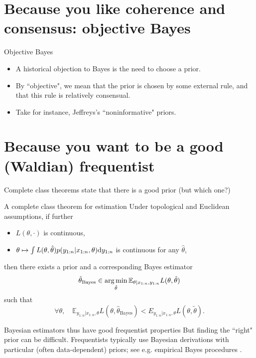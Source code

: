 \documentclass[10pt]{beamer}
\begin{document}
\section{Because you like coherence and consensus: objective Bayes}
\begin{frame}{Objective Bayes}
\begin{itemize}
\item A historical objection to Bayes is the need to choose a prior.
\item By ``objective", we mean that the prior is chosen by some external rule, and that this rule is relatively consensual.
\item Take for instance, Jeffreys's ``noninformative" priors.
\blank
\end{itemize}
\end{frame}

\section{Because you want to be a good (Waldian) frequentist}

\begin{frame}{Complete class theorems state that there is a good prior (but which one?)}

\begin{block}{A complete class theorem for estimation \citep{Ber85}}
Under topological and Euclidean assumptions, if further \begin{itemize}
\item $L(\theta,\cdot)$ is continuous,
\item $\theta\mapsto \int L(\theta,\hat\theta)p(y_{1:n} \vert x_{1:n}, \theta){\rm d} y_{1:n}$ is continuous for any $\hat\theta$,
\end{itemize}
then  there exists a prior and a corresponding Bayes estimator
$$
\hat\theta_{\text{Bayes}} \in \operatorname*{arg\,min}_{\hat\theta} \mathbb{E}_{\theta\vert x_{1:n},y_{1:n}} L(\theta,\hat\theta)
$$
such that
$$ \forall \theta, \quad \mathbb E_{y_{1:n}\vert x_{1:n},\theta} L(\theta,\hat\theta_{\text{Bayes}}) < E_{y_{1:n}\vert x_{1:n},\theta} L(\theta,\tilde\theta).$$
\end{block}
\begin{alertblock}{Bayesian estimators thus have good frequentist properties}
But finding the ``right" prior can be difficult. Frequentists typically use Bayesian derivations with particular (often data-dependent) priors; see e.g. empirical Bayes procedures \citep{Efr10}.
\end{alertblock}
\end{frame}
\end{document}
